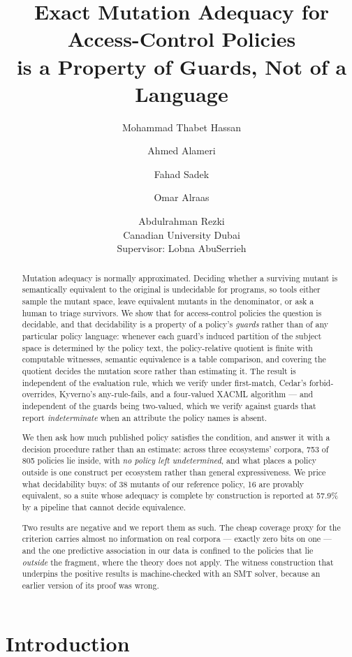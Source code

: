 \documentclass[11pt,a4paper]{article}
\title{Exact Mutation Adequacy for Access-Control Policies\\
is a Property of Guards, Not of a Language}
\author{%
Mohammad Thabet Hassan \and Ahmed Alameri \and Fahad Sadek \and
Omar Alraas \and Abdulrahman Rezki\\[2pt]
\normalsize Canadian University Dubai\\[2pt]
\normalsize Supervisor: Lobna AbuSerrieh
}
\date{}
\theoremstyle{plain}
\theoremstyle{definition}
\theoremstyle{remark}
\begin{document}
\maketitle

\begin{abstract}
Mutation adequacy is normally approximated. Deciding whether a surviving mutant is
semantically equivalent to the original is undecidable for programs, so tools either sample
the mutant space, leave equivalent mutants in the denominator, or ask a human to triage
survivors. We show that for access-control policies the question is decidable, and that
decidability is a property of a policy's \emph{guards} rather than of any particular policy
language: whenever each guard's induced partition of the subject space is determined by the
policy text, the policy-relative quotient is finite with computable witnesses, semantic
equivalence is a table comparison, and covering the quotient decides the mutation score
rather than estimating it. The result is independent of the evaluation rule,
which we verify under first-match, Cedar's forbid-overrides, Kyverno's any-rule-fails, and a
four-valued XACML algorithm --- and independent of the guards being two-valued, which we
verify against guards that report \emph{indeterminate} when an attribute the policy names is
absent.

We then ask how much published policy satisfies the condition, and answer it with a decision
procedure rather than an estimate: across three ecosystems' corpora, 753 of 805 policies lie
inside, with \emph{no policy left undetermined}, and what places a policy outside is one
construct per ecosystem rather than general expressiveness. We price what decidability buys:
of 38 mutants of our reference policy, 16 are provably equivalent, so a suite whose adequacy
is complete by construction is reported at 57.9\% by a pipeline that cannot decide
equivalence.

Two results are negative and we report them as such. The cheap coverage proxy for the
criterion carries almost no information on real corpora --- exactly zero bits on one --- and
the one predictive association in our data is confined to the policies that lie
\emph{outside} the fragment, where the theory does not apply. The witness construction that
underpins the positive results is machine-checked with an SMT solver, because an earlier
version of its proof was wrong.
\end{abstract}

\section{Introduction}
\end{document}
